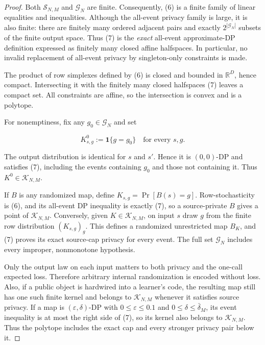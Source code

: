 \begin{proof}
Both \(\mathcal S_{N,M}\) and \(\mathcal G_N\) are finite. Consequently,
(6) is a finite family of linear equalities and inequalities. Although the
all-event privacy family is large, it is also finite: there are finitely many
ordered adjacent pairs and exactly \(2^{|\mathcal G_N|}\) subsets of the
finite output space. Thus (7) is the \emph{exact} all-event approximate-DP
definition expressed as finitely many closed affine halfspaces. In
particular, no invalid replacement of all-event privacy by singleton-only
constraints is made.

The product of row simplexes defined by (6) is closed and bounded in
\(\mathbb R^D\), hence compact. Intersecting it with the finitely many closed
halfspaces (7) leaves a compact set. All constraints are affine, so the
intersection is convex and is a polytope.

For nonemptiness, fix any \(g_0\in\mathcal G_N\) and set

\[
K^0_{s,g}:=\mathbf 1\{g=g_0\}
\quad\text{for every }s,g.
\]

The output distribution is identical for \(s\) and \(s'\). Hence it is
\((0,0)\)-DP and satisfies (7), including the events containing \(g_0\) and
those not containing it. Thus \(K^0\in\mathcal K_{N,M}\).

If \(B\) is any randomized map, define
\(K_{s,g}=\Pr[B(s)=g]\). Row-stochasticity is (6), and its all-event DP
inequality is exactly (7), so a source-private \(B\) gives a point of
\(\mathcal K_{N,M}\). Conversely, given \(K\in\mathcal K_{N,M}\), on input
\(s\) draw \(g\) from the finite row distribution \((K_{s,g})_g\). This
defines a randomized unrestricted map \(B_K\), and (7) proves its exact
source-cap privacy for every event. The full set \(\mathcal G_N\) includes
every improper, nonmonotone hypothesis.

Only the output law on each input matters to both privacy and the one-call
expected loss. Therefore arbitrary internal randomization is encoded without
loss. Also, if a public object is hardwired into a learner's code, the
resulting map still has one such finite kernel and belongs to
\(\mathcal K_{N,M}\) whenever it satisfies source privacy. If a map is
\((\varepsilon,\delta)\)-DP with
\(0\le\varepsilon\le0.1\) and \(0\le\delta\le\bar\delta_M\), its event
inequality is at most the right side of (7), so its kernel also belongs to
\(\mathcal K_{N,M}\). Thus the polytope includes the exact cap and every
stronger privacy pair below it. \end{proof}

